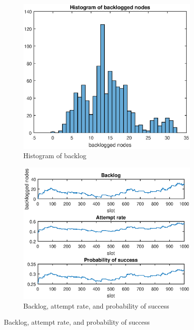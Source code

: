 \documentclass{article}
\begin{document}
\begin{figure}[h]
  \begin{subfigure}{.5\textwidth}
    \centering
    \includegraphics[width=\textwidth]{figures/hist-backlog.eps}
    \caption{Histogram of backlog}
    \label{fig:hist-backlog}
  \end{subfigure}%
  \begin{subfigure}{.5\textwidth}
    \centering
    \includegraphics[width=\textwidth]{figures/backlog-attempt-probsuccess.eps}
    \caption{Backlog, attempt rate, and probability of success}
    \label{fig:backlog-attempt-probsuccess}
  \end{subfigure}
\end{figure}
\end{document}
